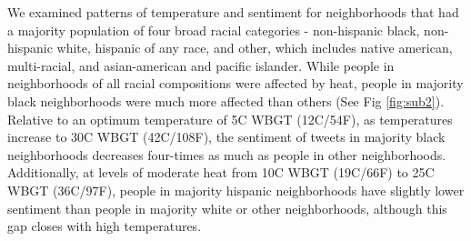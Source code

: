 \documentclass{article}
\begin{document}
We examined patterns of temperature and sentiment for neighborhoods that had a majority population of four broad racial categories - non-hispanic black, non-hispanic white, hispanic of any race, and other, which includes native american, multi-racial, and asian-american and pacific islander.  While people in neighborhoods of all racial compositions were affected by heat, people in majority black neighborhoods were much more affected than others  (See Fig \ref{fig:sub2}).  Relative to an optimum temperature of 5\textdegree C WBGT (12\textdegree C/54\textdegree F), as temperatures increase to 30\textdegree C WBGT (42\textdegree C/108\textdegree F), the sentiment of tweets in majority black neighborhoods decreases four-times as much as people in other neighborhoods.  Additionally, at levels of moderate heat from 10\textdegree C WBGT (19\textdegree C/66\textdegree F) to 25\textdegree C WBGT (36\textdegree C/97\textdegree F), people in majority hispanic neighborhoods have slightly lower sentiment than people in majority white or other neighborhoods, although this gap closes with high temperatures.
\end{document}
